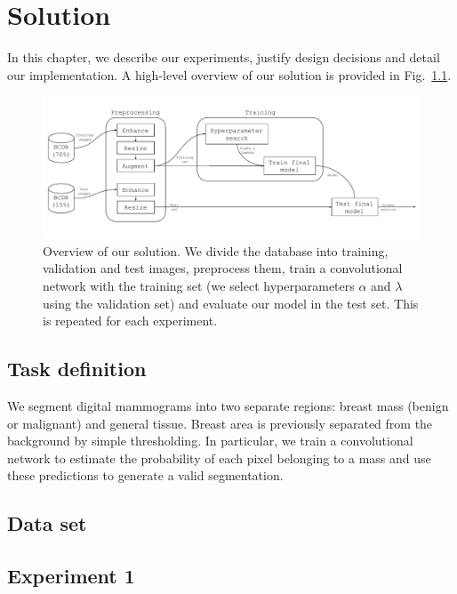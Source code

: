 \chapter{Solution}
\label{ch:Model}

In this chapter, we describe our experiments, justify design decisions and detail our implementation. A high-level overview of our solution is provided in Fig.~\ref{fig:overview}. 
\begin{figure}[ht]
	\centering
	\includegraphics[width=\textwidth]{plots/overview.pdf}
	\caption[Overview of the solution]{Overview of our solution. We divide the database into training, validation and test images, preprocess them, train a convolutional network with the training set (we select hyperparameters $\alpha$ and $\lambda$ using the validation set) and evaluate our model in the test set. This is repeated for each experiment.}
	\label{fig:overview}
\end{figure}

\section{Task definition}
We segment digital mammograms into two separate regions: breast mass (benign or malignant) and general tissue.
Breast area is previously separated from the background by simple thresholding.
In particular, we train a convolutional network to estimate the probability of each pixel belonging to a mass and use these predictions to generate a valid segmentation.

\section{Data set}


\section{Experiment 1}
\label{sec:Experiment1}


